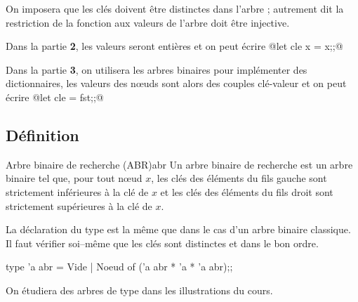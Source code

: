 On imposera que les clés doivent être distinctes dans l'arbre ; autrement dit la restriction de la fonction  aux valeurs de l'arbre doit être injective.

Dans la partie {\bf 2}, les valeurs seront entières et on peut écrire @let cle x = x;;@

Dans la partie {\bf 3}, on utilisera les arbres binaires pour implémenter des dictionnaires, les valeurs des nœuds sont alors des couples clé-valeur et on peut écrire @let cle = fst;;@
\subsection{Définition}
\begin{defin}{Arbre binaire de recherche (ABR)}{abr}
Un arbre binaire de recherche est un arbre binaire tel que,  pour tout nœud $x$,  les clés des éléments du fils gauche sont strictement inférieures à la clé de $x$ et les clés des éléments du fils droit sont strictement supérieures à la clé de $x$.
\end{defin}

\begin{figure*}[h]
\centering
{}
\caption{Exemple : arbre $a_0$}
\label{g:a0}
\end{figure*}

La déclaration du type est la même que dans le cas d'un arbre binaire classique. Il faut vérifier soi--même que les clés sont distinctes et dans le bon ordre.

\begin{ocaml}
type 'a abr = Vide | Noeud of ('a abr * 'a * 'a abr);; 
\end{ocaml} 
On étudiera des arbres de type  dans les illustrations du cours.

